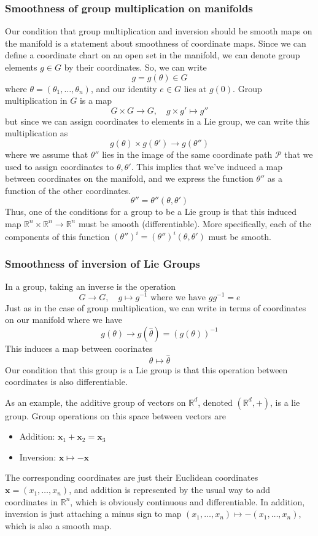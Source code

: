 \subsubsection*{Smoothness of group multiplication on manifolds} 
Our condition that group multiplication and inversion should be smooth maps on the manifold is a statement about smoothness of coordinate maps. Since we can define a coordinate chart on an open set in the manifold, we can denote group elements $g \in G$ by their coordinates. So, we can write 
\[ 
	g  = g (\theta) \in G 
\] 
where $\theta  = ( \theta_1 , \dots, \theta_n)$, and our identity $e \in G$ lies at $g ( 0 )$. 
Group multiplication in $G$ is a map 
\[ 
	G \times G \rightarrow G, \quad g \times g' \mapsto g''  
\] but since we can assign coordinates to elements in a Lie group, we can write this multiplication as 
\[  
	g(\theta) \times g(\theta') \rightarrow g(\theta'') 
\] 
where we assume that $\theta''$ lies in the image of the same coordinate path $\mathcal{P}$ that we used to assign coordinates to $\theta, \theta' $. This implies that we've induced a map between coordinates on the manifold, and we express the function $\theta''$ as a function of the other coordinates. 
\[ 
	\theta''  = \theta''( \theta, \theta' )
\] 
Thus, one of the conditions for a group to be a Lie group is that this induced map $\mathbb{R}^n \times \mathbb{R}^n \rightarrow \mathbb{R}^n $ must be smooth (differentiable). More specifically, each of the components of this function $(\theta'')^i  = (\theta'')^i ( \theta, \theta' ) $ must be smooth. 

\subsubsection*{Smoothness of inversion of Lie Groups} 
In a group, taking an inverse is the operation 
\[ 	
	G \rightarrow G, \quad g \mapsto g^{ -1} \text{ where we have } g g^{ -1}  = e
\] 
Just as in the case of group multiplication, we can write in terms of coordinates on our manifold where we have 
\[ 
	g(\theta) \rightarrow g(\hat{\theta})  = (g(\theta))^{-1} 
\] 
This induces a map between coorinates 
\[ 
	\theta \mapsto \hat{ \theta} 
\] Our condition that this group is a Lie group is that this operation between coordinates is also differentiable. 

As an example, the additive group of vectors on $\mathbb{R}^d$, denoted $( \mathbb{R}^d, + )$, is a lie group. Group operations on this space between vectors are 
\begin{itemize} 
	\item Addition: $\mathbf{x}_1  + \mathbf{x}_2 = \mathbf{x}_3 $ 
	\item Inversion: $\mathbf{x} \mapsto  - \mathbf{x} $
\end{itemize} 
The corresponding coordinates are just their Euclidean coordinates $\mathbf{x} = (x_1, \dots, x_n ) $, and addition is represented by the usual way to add coordinates in $\mathbb{R}^n$, which is obviously continuous and differentiable. In addition, inversion is just attaching a minus sign to map $(x_1, \dots, x_n ) \mapsto  - ( x_1, \dots, x_n ) $, which is also a smooth map. 


